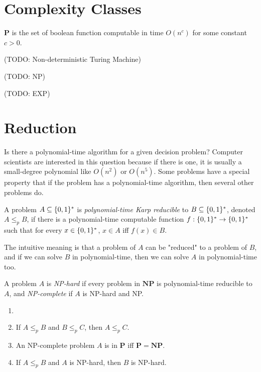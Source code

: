     \section {Complexity Classes}
        \begin{defn}[P] \label{def_comp_p}
        $\mathbf{P}$ is the set of boolean function computable in time $O(n^c)$ for some constant $c>0$.
        \end{defn}
        
        (TODO: Non-deterministic Turing Machine)
        
        (TODO: NP)
        
        (TODO: EXP)
    
    \section {Reduction}
        Is there a polynomial-time algorithm for a given decision problem? Computer scientists are interested in this question because if there is one, it is usually a small-degree polynomial like $O(n^2)$ or $O(n^5)$. Some problems have a special property that if the problem has a polynomial-time algorithm, then several other problems do.
        
        \begin{defn} \label{def_poly_karp}
            A problem $A \subseteq \{0,1\}^\ast$ is \emph{polynomial-time Karp reducible} to $B \subseteq \{0,1\}^\ast$, denoted $A \leq_p B$, if there is a polynomial-time computable function $f: \{0,1\}^\ast \rightarrow \{0,1\}^\ast$ such that for every $x \in \{0,1\}^\ast$, $x \in A$ iff $f(x) \in B$.
        \end{defn}
        
        The intuitive meaning is that a problem of $A$ can be "reduced" to a problem of $B$, and if we can solve $B$ in polynomial-time, then we can solve $A$ in polynomial-time too.
        
        \begin{defn}[NP-complete] \label{def_npc}
            A problem $A$ is \emph{NP-hard} if every problem in $\mathbf{NP}$ is polynomial-time reducible to $A$, and \emph{NP-complete} if $A$ is NP-hard and NP.
        \end{defn}
        
        \begin{thm} \label{thm_leqp_transitive}
            \begin{enumerate}
                \item[]
                \item If $A \leq_p B$ and $B \leq_p C$, then $A \leq_p C$.
                \item An NP-complete problem $A$ is in $\mathbf{P}$ iff $\mathbf{P}=\mathbf{NP}$.
                \item If $A \leq_p B$ and $A$ is NP-hard, then $B$ is NP-hard.
            \end{enumerate}
        \end{thm}
        
